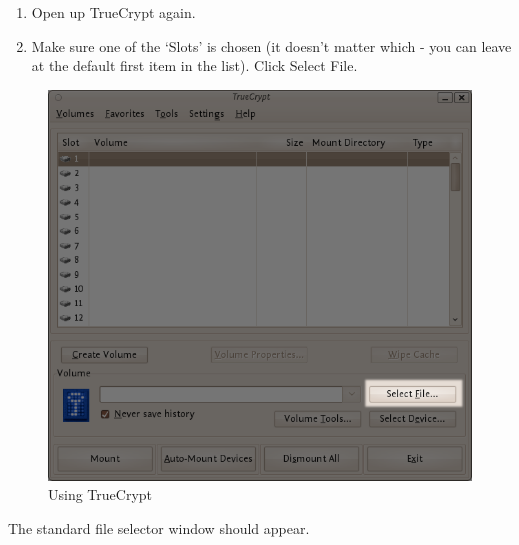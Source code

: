 \begin{enumerate}[1.]
\item
  Open up TrueCrypt again.
\item
  Make sure one of the `Slots' is chosen (it doesn't matter which - you
  can leave at the default first item in the list). Click Select File.
\end{enumerate}
\begin{figure}[htbp]
\centering
\includegraphics{using_tc_012.png}
\caption{Using TrueCrypt}
\end{figure}

The standard file selector window should appear.

